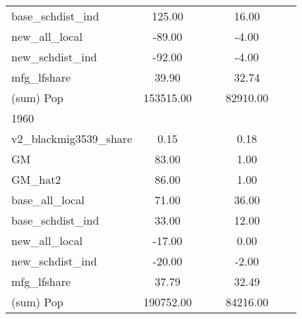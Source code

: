 \begin{table}[htbp]
\begin{tabular}{l*{2}{ccc}}
base\_schdist\_ind    &      125.00&            &            &       16.00&            &            \\
new\_all\_local       &      -89.00&            &            &       -4.00&            &            \\
new\_schdist\_ind     &      -92.00&            &            &       -4.00&            &            \\
mfg\_lfshare         &       39.90&            &            &       32.74&            &            \\
(sum) Pop           &   153515.00&            &            &    82910.00&            &            \\
\midrule
1960                &            &            &            &            &            &            \\
v2\_blackmig3539\_share&        0.15&            &            &        0.18&            &            \\
GM                  &       83.00&            &            &        1.00&            &            \\
GM\_hat2             &       86.00&            &            &        1.00&            &            \\
base\_all\_local      &       71.00&            &            &       36.00&            &            \\
base\_schdist\_ind    &       33.00&            &            &       12.00&            &            \\
new\_all\_local       &      -17.00&            &            &        0.00&            &            \\
new\_schdist\_ind     &      -20.00&            &            &       -2.00&            &            \\
mfg\_lfshare         &       37.79&            &            &       32.49&            &            \\
(sum) Pop           &   190752.00&            &            &    84216.00&            &            \\
\bottomrule
\end{tabular}
\end{table}
